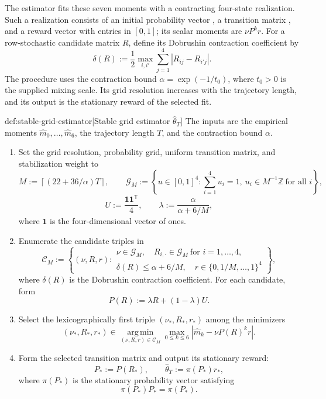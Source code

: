 The estimator fits these seven moments with a contracting four-state realization. Such a realization consists of an initial probability vector , a transition matrix , and a reward vector  with entries in \([0,1]\); its scalar moments are \(\nu P^k r\). For a row-stochastic candidate matrix \(R\), define its Dobrushin contraction coefficient by
\[
\delta(R):=\frac12\max_{i,i'}\sum_{j=1}^{4}|R_{ij}-R_{i'j}|.
\]
The procedure uses the contraction bound \(\alpha=\exp(-1/t_0)\), where \(t_0>0\) is the supplied mixing scale. Its grid resolution  increases with the trajectory length, and its output  is the stationary reward of the selected fit.

\begin{algorithmv}{def:stable-grid-estimator}[Stable grid estimator $\widehat\theta_T$]
The inputs are the empirical moments \(\widehat m_0,\ldots,\widehat m_6\), the trajectory length \(T\), and the contraction bound \(\alpha\).
\begin{enumerate}
\item Set the grid resolution, probability grid, uniform transition matrix, and stabilization weight to
\[
M:=\left\lceil(22+36/\alpha)T\right\rceil,
\qquad
\mathcal G_M
:=
\left\{
u\in[0,1]^4:
\sum_{i=1}^{4}u_i=1,\ 
u_i\in M^{-1}\mathbb Z\ \text{for all }i
\right\},
\]
\[
U:=\frac{\mathbf1\mathbf1^{\mathsf T}}{4},
\qquad
\lambda:=\frac{\alpha}{\alpha+6/M},
\]
where \(\mathbf1\) is the four-dimensional vector of ones.
\item Enumerate the candidate triples in
\[
\mathcal C_M
:=
\left\{
(\nu,R,r):
\begin{gathered}
\nu\in\mathcal G_M,\quad
R_{i,\cdot}\in\mathcal G_M\ \text{for }i=1,\ldots,4,\\
\delta(R)\le\alpha+6/M,\quad
r\in\{0,1/M,\ldots,1\}^{4}
\end{gathered}
\right\},
\]
where \(\delta(R)\) is the Dobrushin contraction coefficient. For each candidate, form
\[
P(R):=\lambda R+(1-\lambda)U.
\]
\item Select the lexicographically first triple \((\nu_*,R_*,r_*)\) among the minimizers
\[
(\nu_*,R_*,r_*)
\in
\operatorname*{arg\,min}_{(\nu,R,r)\in\mathcal C_M}
\max_{0\le k\le6}
\left|\widehat m_k-\nu P(R)^k r\right|.
\]
\item Form the selected transition matrix and output its stationary reward:
\[
P_*:=P(R_*),
\qquad
\widehat\theta_T:=\pi(P_*)r_*,
\]
where \(\pi(P_*)\) is the stationary probability vector satisfying
\[
\pi(P_*)P_*=\pi(P_*).
\]
\end{enumerate}
\end{algorithmv}

